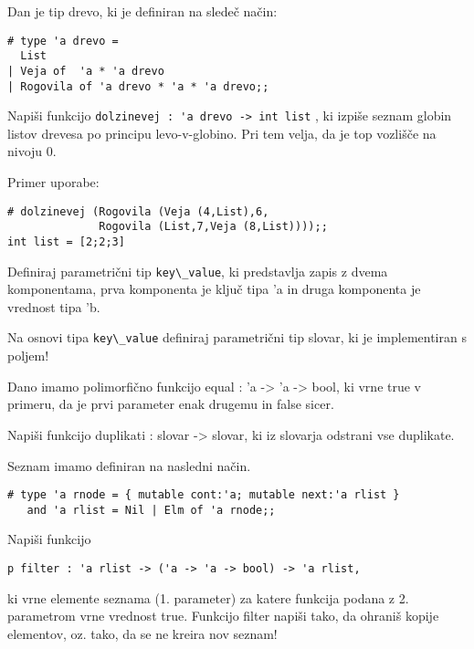 \begin{ex}
Dan je tip drevo, ki je definiran na slede\v c na\v cin:

\begin{lstlisting}
# type 'a drevo =
  List
| Veja of  'a * 'a drevo
| Rogovila of 'a drevo * 'a * 'a drevo;;
\end{lstlisting}
Napi\v si funkcijo \lstinline{dolzinevej : 'a drevo -> int list} , ki izpi\v se seznam globin listov drevesa po principu levo-v-globino. Pri tem velja, da je top vozli\v s\v ce na nivoju 0.

Primer uporabe:

\begin{lstlisting}
# dolzinevej (Rogovila (Veja (4,List),6,
              Rogovila (List,7,Veja (8,List))));;
int list = [2;2;3]
\end{lstlisting}
\end{ex} 
\begin{ex}
Definiraj parametri\v cni tip \lstinline{key\_value}, ki predstavlja zapis z dvema komponentama, prva komponenta je klju\v c tipa 'a in druga komponenta je vrednost tipa 'b. 

Na osnovi tipa \lstinline{key\_value} definiraj parametri\v cni tip slovar, ki je implementiran s poljem! 

Dano imamo polimorfi\v cno funkcijo equal : 'a -> 'a -> bool, ki vrne true v primeru, da je prvi parameter enak drugemu in false sicer. 

Napi\v si funkcijo duplikati : slovar -> slovar, ki iz slovarja odstrani vse duplikate. 
\end{ex} 



\begin{ex}
Seznam imamo definiran na nasledni na\v cin. 
\begin{lstlisting}
# type 'a rnode = { mutable cont:'a; mutable next:'a rlist } 
   and 'a rlist = Nil | Elm of 'a rnode;; 
\end{lstlisting}
Napi\v si funkcijo 
\begin{lstlisting}
p filter : 'a rlist -> ('a -> 'a -> bool) -> 'a rlist,
\end{lstlisting}
 ki vrne elemente seznama (1. parameter) za katere funkcija podana z 2. parametrom vrne vrednost true.
Funkcijo filter napi\v si tako, da ohrani\v s kopije elementov, oz. tako, da se ne kreira nov seznam!
\end{ex} 




